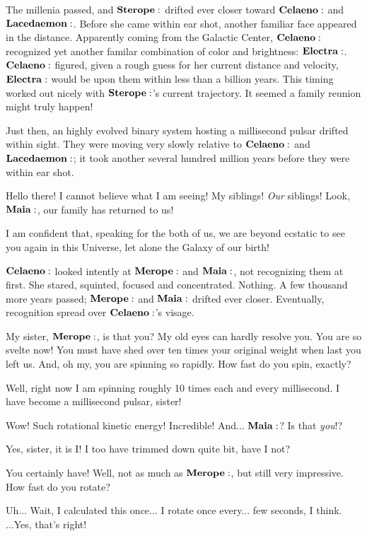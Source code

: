 The millenia passed, and $\Sterope$ drifted ever closer toward $\Celaeno$ and $\Lacedaemon$.  Before she came within ear shot, another familiar face appeared in the distance.  Apparently coming from the Galactic Center, $\Celaeno$ recognized yet another familar combination of color and brightness:  $\Electra$.  $\Celaeno$ figured, given a rough guess for her current distance and velocity, $\Electra$ would be upon them within less than a billion years.  This timing worked out nicely with $\Sterope$'s current trajectory.  It seemed a family reunion might truly happen!

Just then, an highly evolved binary system hosting a millisecond pulsar drifted within sight.  They were moving very slowly relative to $\Celaeno$ and $\Lacedaemon$; it took another several hundred million years before they were within ear shot.

\Merope Hello there!  I cannot believe what I am seeing!  My siblings!  \textit{Our} siblings!  Look, $\Maia$, our family has returned to us!  

\Maia I am confident that, speaking for the both of us, we are beyond ecstatic to see you again in this Universe, let alone the Galaxy of our birth!

$\Celaeno$ looked intently at $\Merope$ and $\Maia$, not recognizing them at first.  She stared, squinted, focused and concentrated.  Nothing.  A few thousand more years passed; $\Merope$ and $\Maia$ drifted ever closer.  Eventually, recognition spread over $\Celaeno$'s visage.

\Celaeno My sister, $\Merope$, is that you?  My old eyes can hardly resolve you.  You are so svelte now!  You must have shed over ten times your original weight when last you left us.  And, oh my, you are spinning so rapidly.  How fast do you spin, exactly?

\Merope Well, right now I am spinning roughly 10 times each and every millisecond.  I have become a millisecond pulsar, sister!  

\Celaeno Wow!  Such rotational kinetic energy!  Incredible!  And... $\Maia$?  Is that \textit{you}!?

\Maia Yes, sister, it is I!  I too have trimmed down quite bit, have I not?

\Celaeno You certainly have!  Well, not as much as $\Merope$, but still very impressive.  How fast do you rotate?

\Maia Uh... Wait, I calculated this once... I rotate once every... few seconds, I think.  ...Yes, that's right!

